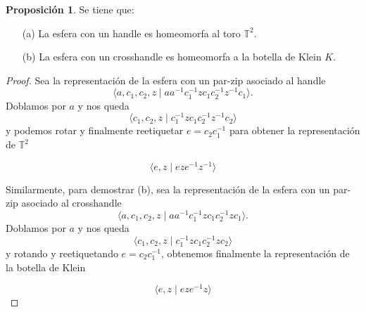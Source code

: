 \documentclass[10pt]{report}
\newcommand{\Toro}{\mathbb{T}^2}
\theoremstyle{definition}
\newtheorem{prop}[defin]{Proposición}
\begin{document}
\begin{prop}\label{prop:handletoro_crosshandleklein}
Se tiene que:

\begin{itemize}

\item[(a)] La esfera con un handle es homeomorfa al toro $\Toro$.
\item [(b)] La esfera con un crosshandle es homeomorfa a la botella de Klein $K$.

\end{itemize}
\end{prop}
\begin{proof}
Sea la representación de la esfera con un par-zip asociado al handle $$\langle a,c_1,c_2,z\mid aa^{-1} c_1^{-1}zc_1c_2^{-1}z^{-1}c_1\rangle.$$ Doblamos por $a$ y nos queda
\[
\langle c_1,c_2,z\mid c_1^{-1}zc_1c_2^{-1}z^{-1}c_2\rangle
\]
y podemos rotar y finalmente reetiquetar $e=c_2c_1^{-1}$ para obtener la representación de $\Toro$ 

\[
\langle e,z\mid eze^{-1}z^{-1}\rangle
\]

Similarmente, para demostrar (b), sea la representación de la esfera con un par-zip asociado al crosshandle $$\langle a,c_1,c_2,z\mid aa^{-1} c_1^{-1}zc_1c_2^{-1}zc_1\rangle.$$ Doblamos por $a$ y nos queda
\[
\langle c_1,c_2,z\mid c_1^{-1}zc_1c_2^{-1}zc_2\rangle
\]
y rotando y reetiquetando $e=c_2c_1^{-1}$, obtenemos finalmente la representación de la botella de Klein

\[
\langle e,z\mid eze^{-1}z\rangle
\]


\end{proof}
\end{document}
